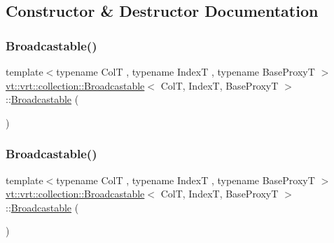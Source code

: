 \subsection{Constructor \& Destructor Documentation}
\mbox{\label{structvt_1_1vrt_1_1collection_1_1_broadcastable_afc16bdb399c4a846fd741062d995a339}} 
\subsubsection{\texorpdfstring{Broadcastable()}{Broadcastable()}\hspace{0.1cm}{\footnotesize\ttfamily [1/4]}}
{\footnotesize\ttfamily template$<$typename ColT , typename IndexT , typename Base\+ProxyT $>$ \\
\hyperlink{structvt_1_1vrt_1_1collection_1_1_broadcastable}{vt\+::vrt\+::collection\+::\+Broadcastable}$<$ ColT, IndexT, Base\+ProxyT $>$\+::\hyperlink{structvt_1_1vrt_1_1collection_1_1_broadcastable}{Broadcastable} (\begin{DoxyParamCaption}{ }\end{DoxyParamCaption})\hspace{0.3cm}{\ttfamily [default]}}

\mbox{\label{structvt_1_1vrt_1_1collection_1_1_broadcastable_ae8d8b03ad2ab2d9c74a3c2b4537ff806}} 
\subsubsection{\texorpdfstring{Broadcastable()}{Broadcastable()}\hspace{0.1cm}{\footnotesize\ttfamily [2/4]}}
{\footnotesize\ttfamily template$<$typename ColT , typename IndexT , typename Base\+ProxyT $>$ \\
\hyperlink{structvt_1_1vrt_1_1collection_1_1_broadcastable}{vt\+::vrt\+::collection\+::\+Broadcastable}$<$ ColT, IndexT, Base\+ProxyT $>$\+::\hyperlink{structvt_1_1vrt_1_1collection_1_1_broadcastable}{Broadcastable} (\begin{DoxyParamCaption}\item[{\hyperlink{structvt_1_1vrt_1_1collection_1_1_broadcastable}{Broadcastable}$<$ ColT, IndexT, Base\+ProxyT $>$ const \&}]{ }\end{DoxyParamCaption})\hspace{0.3cm}{\ttfamily [default]}}

